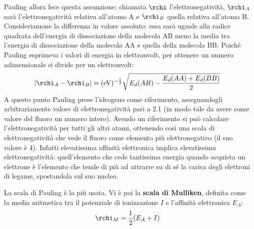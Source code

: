 Pauling allora fece questa assunzione: chiamata $\rchi$ l'elettronegatività, $\rchi_A$ sarà l'elettronegatività relativa all'atomo A e $\rchi_B$ quella relativa all'atomo B. Consideriamone la differenza in valore assoluto: essa sarà uguale alla radice quadrata dell'energia di dissociazione della molecola AB meno la media tra l'energia di dissociazione della molecola AA e quella della molecola BB. Poiché Pauling esprimeva i valori di energia in elettronvolt, per ottenere un numero adimensionale si divide per un elettronvolt:
$$|\rchi_A - \rchi_B| = (\text{eV})^{-\frac{1}{2}}\sqrt{E_d(AB)-\frac{E_d(AA) + E_d(BB)}{2}}$$
A questo punto Pauling prese l'idrogeno come riferimento, assegnandogli arbitrariamente valore di elettronegatività pari a 2.1 (in modo tale da avere come valore del fluoro un numero intero). Avendo un riferimento si può calcolare l'elettronegatività per tutti gli altri atomi, ottenendo così una scala di elettronegatività che vede il fluoro come elemento più elettronegativo (il suo valore è 4). Infatti elevatissima affinità elettronica implica elevatissima elettronegatività: quell'elemento che cede tantissima energia quando acquista un elettrone è l'elemento che tende di più ad attrarre su di sé la carica degli elettroni di legame, spostandola sul suo nucleo.

\vspace{0.2cm}La scala di Pauling è la più usata. Vi è poi la \textbf{scala di Mulliken}, definita come la media aritmetica tra il potenziale di ionizzazione $I$ e l'affinità elettronica $E_A$:
$$\rchi_M=\frac{1}{2}(E_A + I)$$